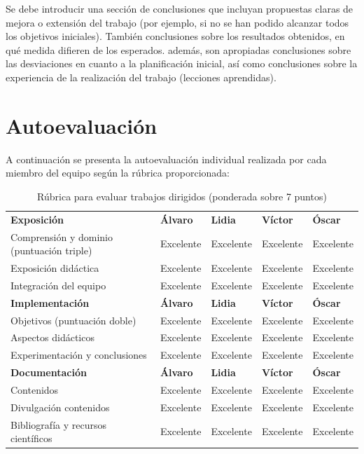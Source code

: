 \documentclass[a4paper]{article}
\begin{document}
Se debe introducir una sección de conclusiones que incluyan propuestas claras de mejora o extensión del trabajo (por ejemplo, si no se han podido alcanzar todos los objetivos iniciales). También conclusiones sobre los resultados obtenidos, en qué medida difieren de los esperados. además, son apropiadas conclusiones sobre las desviaciones en cuanto a la planificación inicial, así como conclusiones sobre la experiencia de la realización del trabajo (lecciones aprendidas).
\newpage
\section{Autoevaluación}
A continuación se presenta la autoevaluación individual realizada por cada miembro del equipo según la rúbrica proporcionada:

\begin{table}[htbp]
  \centering
  \scriptsize
  \renewcommand{\arraystretch}{1.5}
  \setlength{\tabcolsep}{4pt}
  \begin{tabular}{|>{\raggedright\arraybackslash}p{2.8cm}|>{\raggedright\arraybackslash}p{3cm}|>{\raggedright\arraybackslash}p{3cm}|>{\raggedright\arraybackslash}p{3cm}|>{\raggedright\arraybackslash}p{3cm}|}
  \hline
  \multicolumn{5}{|c|}{\textbf{Rúbrica para evaluar los trabajos dirigidos}} \\
  \hline
  \textbf{Exposición} &  \textbf{Álvaro} & \textbf{Lidia} & \textbf{Víctor} & \textbf{Óscar} \\
  \hline
  Comprensión y dominio (puntuación triple)& Excelente & Excelente & Excelente & Excelente \\
  \hline
  Exposición didáctica & Excelente & Excelente & Excelente & Excelente\\
  \hline
  Integración del equipo & Excelente & Excelente & Excelente & Excelente \\
  \hline
  \textbf{Implementación} & \textbf{Álvaro} & \textbf{Lidia} & \textbf{Víctor} & \textbf{Óscar} \\
  \hline
  Objetivos (puntuación doble)& Excelente & Excelente & Excelente & Excelente \\
  \hline
  Aspectos didácticos & Excelente & Excelente & Excelente & Excelente \\
  \hline
  Experimentación y conclusiones & Excelente & Excelente & Excelente & Excelente \\
  \hline
  \textbf{Documentación} & \textbf{Álvaro} & \textbf{Lidia} & \textbf{Víctor} & \textbf{Óscar} \\
  \hline
  Contenidos & Excelente & Excelente & Excelente & Excelente \\
  \hline
  Divulgación contenidos & Excelente & Excelente & Excelente & Excelente \\
  \hline
  Bibliografía y recursos científicos & Excelente & Excelente & Excelente & Excelente \\
  \hline
  \end{tabular}
  \caption{Rúbrica para evaluar trabajos dirigidos (ponderada sobre 7 puntos)}
  \end{table}
\end{document}
